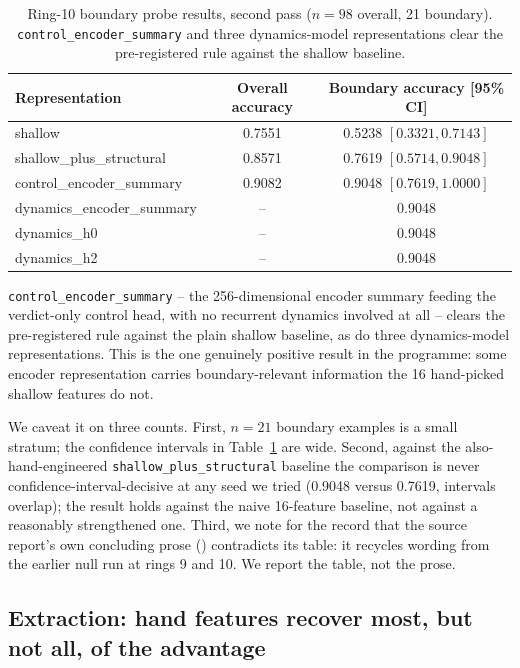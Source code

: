 \begin{table}[htbp]
\centering
\begin{tabular}{lcc}
\toprule
Representation & Overall accuracy & Boundary accuracy [95\% CI] \\
\midrule
shallow & 0.7551 & 0.5238 $[0.3321, 0.7143]$ \\
shallow\_plus\_structural & 0.8571 & 0.7619 $[0.5714, 0.9048]$ \\
control\_encoder\_summary & 0.9082 & 0.9048 $[0.7619, 1.0000]$ \\
dynamics\_encoder\_summary & -- & 0.9048 \\
dynamics\_h0 & -- & 0.9048 \\
dynamics\_h2 & -- & 0.9048 \\
\bottomrule
\end{tabular}
\caption{Ring-10 boundary probe results, second pass ($n=98$ overall,
21 boundary). \texttt{control\_encoder\_summary} and three dynamics-model
representations clear the pre-registered rule against the shallow
baseline.}
\label{tab:boundary}
\end{table}

\texttt{control\_encoder\_summary} -- the 256-dimensional encoder summary
feeding the verdict-only control head, with no recurrent dynamics involved
at all -- clears the pre-registered rule against the plain shallow
baseline, as do three dynamics-model representations. This is the one
genuinely positive result in the programme: some encoder representation
carries boundary-relevant information the 16 hand-picked shallow features
do not.

We caveat it on three counts. First, $n=21$ boundary examples is a small
stratum; the confidence intervals in Table~\ref{tab:boundary} are wide.
Second, against the also-hand-engineered \texttt{shallow\_plus\_structural}
baseline the comparison is never confidence-interval-decisive at any seed
we tried (0.9048 versus 0.7619, intervals overlap); the result holds
against the naive 16-feature baseline, not against a reasonably strengthened
one. Third, we note for the record that the source report's own concluding
prose () contradicts its table: it
recycles wording from the earlier null run at rings 9 and 10. We report the
table, not the prose.

\subsection{Extraction: hand features recover most, but not all, of the advantage}
\label{sec:ml-extraction}

